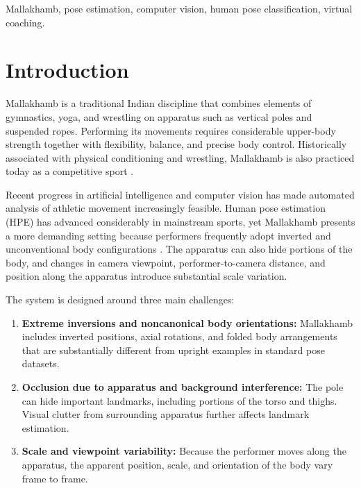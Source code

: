 \documentclass{ieeeaccess}
\begin{document}
\begin{keywords}
Mallakhamb, pose estimation, computer vision, human pose classification, virtual coaching.
\end{keywords}

\titlepgskip=-15pt

\maketitle

\section{Introduction}
\label{sec:introduction}

Mallakhamb is a traditional Indian discipline that combines elements of gymnastics, yoga, and wrestling on apparatus such as vertical poles and suspended ropes. Performing its movements requires considerable upper-body strength together with flexibility, balance, and precise body control. Historically associated with physical conditioning and wrestling, Mallakhamb is also practiced today as a competitive sport \cite{b12}.

Recent progress in artificial intelligence and computer vision has made automated analysis of athletic movement increasingly feasible. Human pose estimation (HPE) has advanced considerably in mainstream sports, yet Mallakhamb presents a more demanding setting because performers frequently adopt inverted and unconventional body configurations \cite{b1,b2,b3}. The apparatus can also hide portions of the body, and changes in camera viewpoint, performer-to-camera distance, and position along the apparatus introduce substantial scale variation.

The system is designed around three main challenges:
\begin{enumerate}
    \item \textbf{Extreme inversions and noncanonical body orientations:} Mallakhamb includes inverted positions, axial rotations, and folded body arrangements that are substantially different from upright examples in standard pose datasets.
    \item \textbf{Occlusion due to apparatus and background interference:} The pole can hide important landmarks, including portions of the torso and thighs. Visual clutter from surrounding apparatus further affects landmark estimation.
    \item \textbf{Scale and viewpoint variability:} Because the performer moves along the apparatus, the apparent position, scale, and orientation of the body vary frame to frame.
\end{enumerate}
\end{document}
